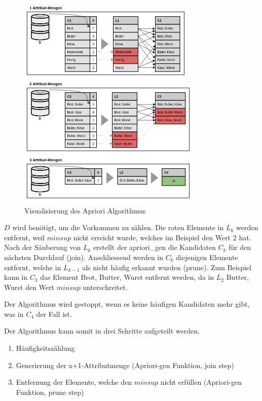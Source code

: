 \begin{figure}[H]
\RawFloats
\centering
\includegraphics[width=0.8\textwidth]{images/Apriori-Algorithmus.png}
\caption{Visualisierung des Apriori Algorithmus}
\label{fig:recherche:vorgehensweise:apriorialgorithmus}
\end{figure}

$D$ wird benötigt, um die Vorkommen zu zählen. Die roten Elemente in $L_k$ werden entfernt, weil $minsup$ nicht erreicht wurde, welches im Beispiel den Wert 2 hat. Nach der Säuberung von $L_k$ erstellt der apriori\_gen die Kandidaten $C_k$ für den nächsten Durchlauf (join). Anschliessend werden in $C_k$ diejenigen Elemente entfernt, welche in $L_{k-1}$ als nicht häufig erkannt wurden (prune). Zum Beispiel kann in $C_3$ das Element {Brot, Butter, Wurst} entfernt werden, da in $L_2$ {Butter, Wurst} den Wert $minsup$ unterschreitet.

Der Algorithmus wird gestoppt, wenn es keine häufigen Kandidaten mehr gibt, was in $C_4$ der Fall ist.

Der Algorithmus kann somit in drei Schritte aufgeteilt werden.
\begin{enumerate}
\item Häufigkeitszählung
\item Generierung der x+1-Attributmenge (Apriori-gen Funktion, join step)
\item Entfernung der Elemente, welche den $minsup$ nicht erfüllen (Apriori-gen Funktion, prune step)
\end{enumerate}

